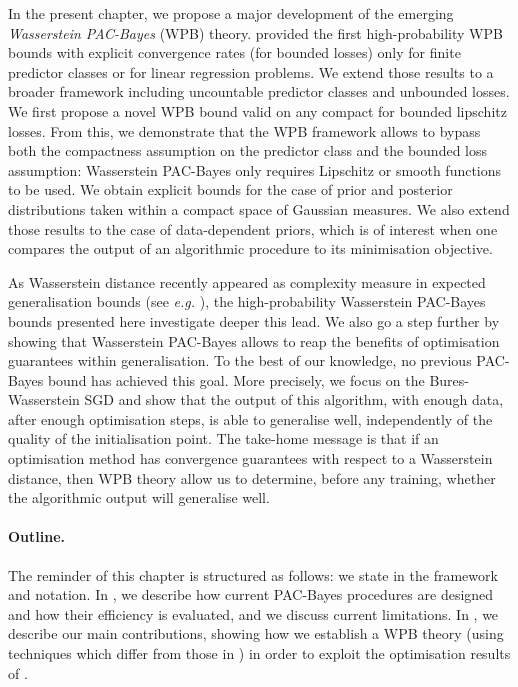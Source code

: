 In the present chapter, we propose a major development of the emerging \emph{Wasserstein PAC-Bayes} (WPB) theory.
\citet{amit2022integral} provided the first high-probability WPB bounds with explicit convergence rates (for bounded losses) only for finite predictor classes or for linear regression problems. We extend those results to a broader framework including uncountable predictor classes and unbounded losses. We first propose a novel  WPB bound valid on any compact for bounded lipschitz losses. From this, we demonstrate that the WPB framework allows to bypass both the compactness assumption on the predictor class and the bounded loss assumption: Wasserstein PAC-Bayes only requires Lipschitz or smooth functions to be used. We obtain explicit bounds for the case of prior and posterior distributions taken within a compact space of Gaussian measures.
We also extend those results to the case of data-dependent priors, which is of interest when one compares the output of an algorithmic procedure to its minimisation objective.


As Wasserstein distance recently appeared as complexity measure in expected generalisation bounds (see \emph{e.g.} \citealp{rodriguez2021tighter}), the high-probability Wasserstein PAC-Bayes bounds presented here investigate deeper this lead. We also go a step further by showing that Wasserstein PAC-Bayes allows to reap the benefits of optimisation guarantees within generalisation. To the best of our knowledge, no previous PAC-Bayes bound has achieved this goal.
More precisely, we focus on the Bures-Wasserstein SGD \citep{altschuler2021aver,lambert2022variational} and show that the output of this algorithm, with enough data, after enough optimisation steps, is able to generalise well, independently of the quality of the initialisation point. The take-home message is that if an optimisation method has convergence guarantees with respect to a Wasserstein distance, then WPB theory allow us to determine, before any training, whether the algorithmic output will generalise well.

\paragraph{Outline.}
The reminder of this chapter is structured as follows: we state in  the framework and notation. In , we describe how current PAC-Bayes procedures are designed and how their efficiency is evaluated, and we discuss current limitations.
In , we describe our main contributions, showing how we establish a WPB theory (using techniques which differ from those in \citealp{amit2022integral}) in order to exploit the optimisation results of \citet{lambert2022variational}.

